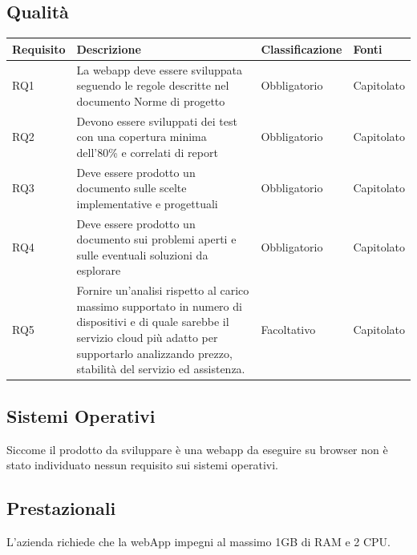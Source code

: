 \documentclass[12pt]{article}
\begin{document}
\subsection{Qualità}
\begin{tabular}{ |p{1.8cm}|p{5.2cm}|p{3cm}| p{2cm}| }
\hline
Requisito& Descrizione &Classificazione &Fonti \\
\hline
RQ1 & La webapp deve essere sviluppata seguendo le regole descritte nel documento Norme di progetto & Obbligatorio & Capitolato \\
RQ2 & Devono essere sviluppati dei test con una copertura minima dell'80\% e correlati di report & Obbligatorio & Capitolato\\
RQ3 & Deve essere prodotto un documento sulle scelte implementative e progettuali & Obbligatorio & Capitolato \\
RQ4 & Deve essere prodotto un documento sui problemi aperti e sulle eventuali soluzioni da esplorare & Obbligatorio & Capitolato \\
RQ5 & Fornire un’analisi rispetto al carico massimo supportato in numero di dispositivi e di quale sarebbe il servizio cloud più adatto per supportarlo analizzando prezzo, stabilità del servizio ed assistenza.  &  Facoltativo & Capitolato \\
\hline

\end{tabular}
\subsection{Sistemi Operativi}
Siccome il prodotto da sviluppare è una webapp da eseguire su browser non è stato individuato nessun requisito sui sistemi operativi.
\subsection{Prestazionali}
L'azienda richiede che la webApp impegni al massimo 1GB di RAM e 2 CPU.
\end{document}
